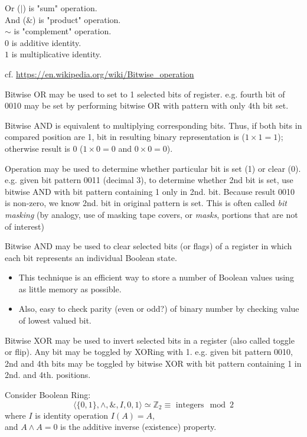 \documentclass[10pt]{amsart}
\begin{document}
Or ($|$) is "sum" operation. \\
And ($\&$) is "product" operation. \\
$\sim$ is "complement" operation. \\
$0$ is additive identity. \\
$1$ is multiplicative identity.

cf. \url{https://en.wikipedia.org/wiki/Bitwise_operation}

Bitwise OR may be used to set to 1 selected bits of register. e.g. fourth bit of 0010 may be set by performing bitwise OR with pattern with only 4th bit set.

Bitwise AND is equivalent to multiplying corresponding bits. Thus, if both bits in compared position are 1, bit in resulting binary representation is ($1 \times 1 = 1$); otherwise result is 0 ($1 \times 0 = 0$ and $0 \times 0 = 0$).

Operation may be used to determine whether particular bit is set (1) or clear (0). e.g. given bit pattern 0011 (decimal 3), to determine whether 2nd bit is set, use bitwise AND with bit pattern containing 1 only in 2nd. bit. Because result 0010 is non-zero, we know 2nd. bit in original pattern is set. This is often called \emph{bit masking} (by analogy, use of masking tape covers, or \emph{masks}, portions that are not of interest)

Bitwise AND may be used to clear selected bits (or flags) of a register in which each bit represents an individual Boolean state.
\begin{itemize}
	\item This technique is an efficient way to store a number of Boolean values using as little memory as possible.
	\item Also, easy to check parity (even or odd?) of binary number by checking value of lowest valued bit.
\end{itemize}

Bitwise XOR may be used to invert selected bits in a register (also called toggle or flip). Any bit may be toggled by XORing with 1. e.g. given bit pattern 0010, 2nd and 4th bits may be toggled by bitwise XOR with bit pattern containing 1 in 2nd. and 4th. positions.


Consider Boolean Ring:
\[
\langle \lbrace 0 , 1 \rbrace, \wedge, \&, I, 0 , 1 \rangle \simeq \mathbb{Z}_2 \equiv  \text{ integers} \mod{2} 
\]
where $I$ is identity operation $I(A) = A$, \\
and 
$A\wedge A = 0$ is the additive inverse (existence) property.
\end{document}
